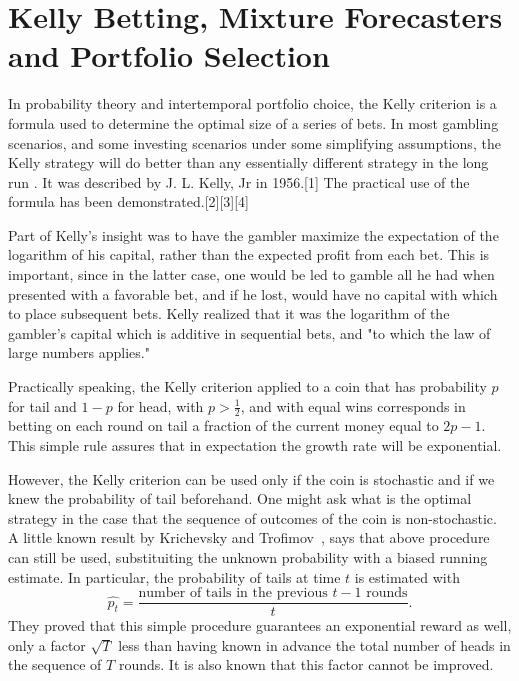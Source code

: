 \section{Kelly Betting, Mixture Forecasters and Portfolio Selection}

In probability theory and intertemporal portfolio choice, the Kelly criterion is a formula used to determine the optimal size of a series of bets. In most gambling scenarios, and some investing scenarios under some simplifying assumptions, the Kelly strategy will do better than any essentially different strategy in the long run \cite{}. It was described by J. L. Kelly, Jr in 1956.[1] The practical use of the formula has been demonstrated.[2][3][4]

Part of Kelly's insight was to have the gambler maximize the expectation of the logarithm of his capital, rather than the expected profit from each bet. This is important, since in the latter case, one would be led to gamble all he had when presented with a favorable bet, and if he lost, would have no capital with which to place subsequent bets. Kelly realized that it was the logarithm of the gambler's capital which is additive in sequential bets, and "to which the law of large numbers applies."

Practically speaking, the Kelly criterion applied to a coin that has probability $p$ for tail and $1-p$ for head, with $p> \frac{1}{2}$, and with equal wins corresponds in betting on each round on tail a fraction of the current money equal to $2p-1$. This simple rule assures that in expectation the growth rate will be exponential.

However, the Kelly criterion can be used only if the coin is stochastic and if we knew the probability of tail beforehand. One might ask what is the optimal strategy in the case that the sequence of outcomes of the coin is non-stochastic.
A little known result by Krichevsky and Trofimov~\cite{}, says that above procedure can still be used, substituiting the  unknown probability with a biased running estimate. In particular, the probability of tails at time $t$ is estimated with 
\[
\hat{p_t}=\frac{\text{number of tails in the previous } t-1 \text{ rounds}}{t}.
\]
They proved that this simple procedure guarantees an exponential reward as well, only a factor $\sqrt{T}$ less than having known in advance the total number of heads in the sequence of $T$ rounds. It is also known that this factor cannot be improved.

